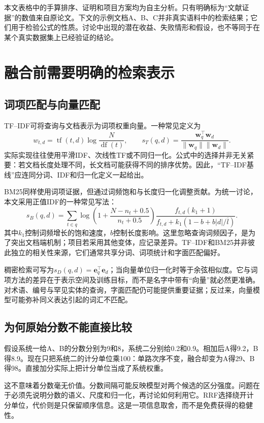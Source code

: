 \documentclass[sigconf,nonacm]{acmart}
\begin{document}
本文表格中的手算排序、证明和项目方案均为自主分析。只有明确标为“文献证据”的数值来自原论文。下文的示例文档A、B、C并非真实语料中的检索结果；它们用于检验公式的性质。讨论中出现的潜在收益、失败情形和假设，也不等同于在某个真实数据集上已经验证的结论。

\section{融合前需要明确的检索表示}
\subsection{词项匹配与向量匹配}
TF--IDF可将查询与文档表示为词项权重向量。一种常见定义为
\begin{equation}
 w_{t,d}=\operatorname{tf}(t,d)\log\frac{N}{\operatorname{df}(t)},\qquad
 s_T(q,d)=\frac{\boldsymbol w_q^\top\boldsymbol w_d}
 {\|\boldsymbol w_q\|\|\boldsymbol w_d\|}.
\end{equation}
实际实现往往使用平滑IDF、次线性TF或不同归一化。公式中的选择并非无关紧要：若文档长度处理不同，长文档可能获得不同的排序优势。因此，“TF--IDF基线”应连同分词、IDF和归一化定义一起给出。

BM25同样使用词项证据，但通过词频饱和与长度归一化调整贡献。为统一讨论，本文采用正值IDF的一种常见写法：
\begin{equation}
 s_B(q,d)=\sum_{t\in q}\log\left(1+\frac{N-n_t+0.5}{n_t+0.5}\right)
 \frac{f_{t,d}(k_1+1)}{f_{t,d}+k_1(1-b+b|d|/\overline l)}.
\end{equation}
其中$k_1$控制词频增长的饱和速度，$b$控制长度影响。这里忽略查询词频因子，是为了突出文档端机制；项目若采用其他变体，应记录差异。TF--IDF和BM25并非彼此独立的相关性来源，它们通常共享分词、词项统计和字面匹配偏好。

稠密检索可写为$s_D(q,d)=\boldsymbol e_q^\top\boldsymbol e_d$；当向量单位归一化时等于余弦相似度。它与词项方法的差异在于表示空间及训练目标，而不是名字中带有“向量”就必然更准确。对术语、编号与罕见实体的查询，字面匹配仍可能提供重要证据；反过来，向量模型可能弥补同义表达引起的词汇不匹配。

\subsection{为何原始分数不能直接比较}
假设系统一给A、B的分数分别为9和8，系统二分别给0.2和0.9。相加后A得9.2，B得8.9。现在只把系统二的计分单位乘100：单路次序不变，融合却变为A得29、B得98。直接加分实际上把计分单位当成了系统权重。

这不意味着分数毫无价值。分数间隔可能反映模型对两个候选的区分强度。问题在于必须先说明分数的语义、尺度和归一化，再讨论如何利用它。RRF选择绕开计分单位，代价则是只保留顺序信息。这是一项信息取舍，而不是免费获得的稳健性。
\end{document}
